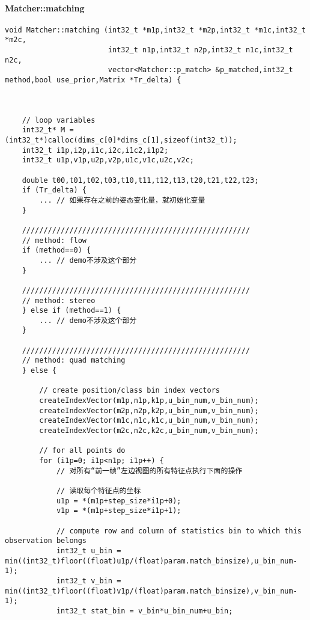 \documentclass[UTF8]{ctexart}
\begin{document}
    \paragraph{Matcher::matching}
    \begin{verbatim}
void Matcher::matching (int32_t *m1p,int32_t *m2p,int32_t *m1c,int32_t *m2c,
                        int32_t n1p,int32_t n2p,int32_t n1c,int32_t n2c,
                        vector<Matcher::p_match> &p_matched,int32_t method,bool use_prior,Matrix *Tr_delta) {

    
    
    // loop variables
    int32_t* M = (int32_t*)calloc(dims_c[0]*dims_c[1],sizeof(int32_t));
    int32_t i1p,i2p,i1c,i2c,i1c2,i1p2;
    int32_t u1p,v1p,u2p,v2p,u1c,v1c,u2c,v2c;
    
    double t00,t01,t02,t03,t10,t11,t12,t13,t20,t21,t22,t23;
    if (Tr_delta) {
        ... // 如果存在之前的姿态变化量，就初始化变量
    }

    /////////////////////////////////////////////////////
    // method: flow
    if (method==0) {
        ... // demo不涉及这个部分
    }
        
    /////////////////////////////////////////////////////
    // method: stereo
    } else if (method==1) {
        ... // demo不涉及这个部分
    }
        
    /////////////////////////////////////////////////////
    // method: quad matching
    } else {
        
        // create position/class bin index vectors
        createIndexVector(m1p,n1p,k1p,u_bin_num,v_bin_num);
        createIndexVector(m2p,n2p,k2p,u_bin_num,v_bin_num);
        createIndexVector(m1c,n1c,k1c,u_bin_num,v_bin_num);
        createIndexVector(m2c,n2c,k2c,u_bin_num,v_bin_num);
        
        // for all points do
        for (i1p=0; i1p<n1p; i1p++) {
            // 对所有“前一帧”左边视图的所有特征点执行下面的操作

            // 读取每个特征点的坐标
            u1p = *(m1p+step_size*i1p+0);
            v1p = *(m1p+step_size*i1p+1);

            // compute row and column of statistics bin to which this observation belongs
            int32_t u_bin = min((int32_t)floor((float)u1p/(float)param.match_binsize),u_bin_num-1);
            int32_t v_bin = min((int32_t)floor((float)v1p/(float)param.match_binsize),v_bin_num-1);
            int32_t stat_bin = v_bin*u_bin_num+u_bin;


\end{verbatim}
\end{document}
